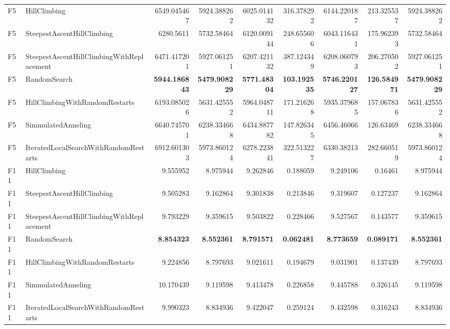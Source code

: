 \begin{tabular}{llrrrrrrr}
F5 & HillClimbing & 6549.045467 & 5924.388262 & 6025.014132 & 316.378292 & 6144.220187 & 213.325537 & 5924.388262 \\ 
F5 & SteepestAscentHillClimbing & 6280.5611 & 5732.58464 & 6120.009144 & 248.655606 & 6043.116431 & 175.962393 & 5732.58464 \\ 
F5 & SteepestAscentHillClimbingWithReplacement & 6471.417201 & 5927.061251 & 6207.421132 & 387.124349 & 6208.060793 & 206.270502 & 5927.061251 \\ 
F5 & RandomSearch & \textbf{5944.186843} & \textbf{5479.908229} & \textbf{5771.48304} & \textbf{103.192535} & \textbf{5746.220127} & \textbf{126.584971} & \textbf{5479.908229} \\ 
F5 & HillClimbingWithRandomRestarts & 6193.085026 & 5631.425552 & 5964.048711 & 171.216268 & 5935.379685 & 157.067836 & 5631.425552 \\ 
F5 & SimmulatedAnneling & 6640.745701 & 6238.334668 & 6434.887782 & 147.826345 & 6456.46066 & 126.63469 & 6238.334668 \\ 
F5 & IteratedLocalSearchWithRandomRestarts & 6912.601303 & 5973.860124 & 6278.223841 & 322.513227 & 6330.38213 & 282.660519 & 5973.860124 \\ 
F11 & HillClimbing & 9.555952 & 8.975944 & 9.262846 & 0.188059 & 9.249106 & 0.16461 & 8.975944 \\ 
F11 & SteepestAscentHillClimbing & 9.505283 & 9.162864 & 9.301838 & 0.213846 & 9.319607 & 0.127237 & 9.162864 \\ 
F11 & SteepestAscentHillClimbingWithReplacement & 9.793229 & 9.359615 & 9.503822 & 0.228466 & 9.527567 & 0.143577 & 9.359615 \\ 
F11 & RandomSearch & \textbf{8.854323} & \textbf{8.552361} & \textbf{8.791571} & \textbf{0.062481} & \textbf{8.773659} & \textbf{0.089171} & \textbf{8.552361} \\ 
F11 & HillClimbingWithRandomRestarts & 9.224856 & 8.797693 & 9.021611 & 0.194679 & 9.031901 & 0.137439 & 8.797693 \\ 
F11 & SimmulatedAnneling & 10.170439 & 9.119598 & 9.413478 & 0.226858 & 9.445788 & 0.326145 & 9.119598 \\ 
F11 & IteratedLocalSearchWithRandomRestarts & 9.990323 & 8.834936 & 9.422047 & 0.259124 & 9.432598 & 0.316243 & 8.834936 \\ 
\bottomrule
\end{tabular}
